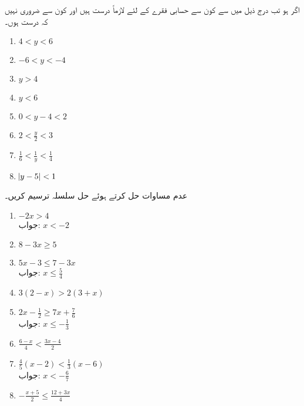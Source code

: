 اگر  ہو تب درج ذیل  میں سے کون سے حسابی فقرے  کے لئے لازماً درست ہیں اور کون سے ضروری نہیں کہ درست ہوں۔
\begin{multicols}{3}
\begin{enumerate}[a]
\item
$4<y<6$
\item
$-6<y<-4$
\item
$y>4$
\item
$y<6$
\item
$0<y-4<2$
\item
$2<\frac{y}{2}<3$
\item
$\frac{1}{6}<\frac{1}{y}<\frac{1}{4}$
\item
$\abs{y-5}<1$
\end{enumerate}
\end{multicols} 
عدم مساوات حل کرتے ہوئے حل سلسلہ ترسیم کریں۔
\begin{multicols}{2}
\begin{enumerate}[]
\item
{}
$-2x>4$\\
جواب:\quad 
$x<-2$
\item
{}
$8-3x\ge 5$
\item
{}
$5x-3\le 7-3x$\\
جواب:\quad
$x\le \tfrac{5}{4}$
\item
{}
$3(2-x)>2(3+x)$
\item
{}
$2x-\frac{1}{2}\ge 7x+\frac{7}{6}$\\
جواب:\quad 
$x\le -\tfrac{1}{3}$
\item
{}
$\frac{6-x}{4}<\frac{3x-4}{2}$
\item
{}
$\frac{4}{5}(x-2)<\frac{1}{3}(x-6)$\\
جواب:\quad
$x<-\tfrac{6}{7}$
\item
{}
$-\frac{x+5}{2}\le \frac{12+3x}{4}$
\end{enumerate}
\end{multicols}


